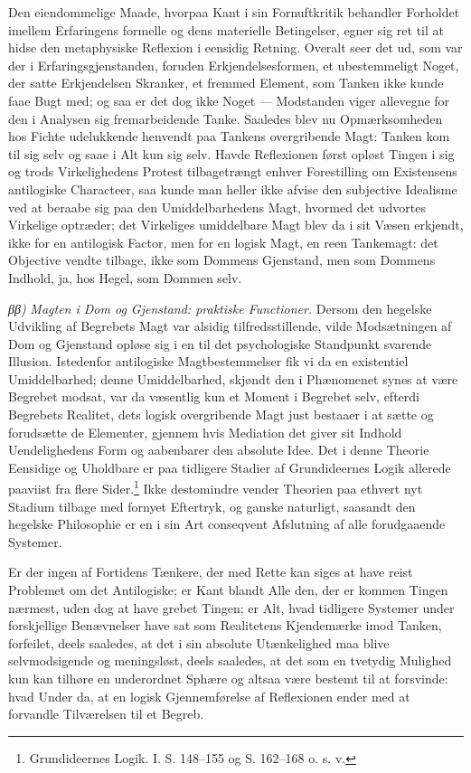 \documentclass[12pt]{book}
\newcommand{\opage}[1]{\marginnote{\footnotesize\textit{[#1]}}}
\begin{document}
Den eiendommelige Maade, hvorpaa Kant i sin Fornuftkritik
behandler Forholdet imellem Erfaringens formelle og
dens materielle Betingelser, egner sig ret til at hidse den metaphysiske
Reflexion i eensidig Retning. Overalt seer det
ud, som var der i Erfaringsgjenstanden, foruden Erkjendelsesformen,
et ubestemmeligt Noget, der satte Erkjendelsen Skranker,
et fremmed Element, som Tanken ikke kunde faae Bugt med;
og saa er det dog ikke Noget --- Modstanden viger allevegne for
den i Analysen sig fremarbeidende Tanke. Saaledes blev nu
Opmærksomheden hos Fichte udelukkende henvendt paa Tankens
overgribende Magt: Tanken kom til sig selv og saae i Alt
kun sig selv. Havde Reflexionen først opløst Tingen i sig og
trods Virkelighedens Protest tilbagetrængt enhver Forestilling
om Existensens antilogiske Characteer, saa kunde man heller
ikke afvise den subjective Idealisme ved at beraabe sig paa den
Umiddelbarhedens Magt, hvormed det udvortes Virkelige optræder;
det Virkeliges umiddelbare Magt blev da i sit Væsen
erkjendt, ikke for en antilogisk Factor, men for en logisk Magt,
en reen Tankemagt: det Objective vendte tilbage, ikke som
Dommens Gjenstand, men som Dommens Indhold, ja, hos
Hegel, som Dommen selv.

\textit{ββ)} \emph{Magten i Dom og Gjenstand: praktiske
Functioner.} Dersom den hegelske Udvikling af Begrebets
Magt var alsidig tilfredsstillende, vilde Modsætningen af Dom
og Gjenstand opløse sig i en til det psychologiske Standpunkt
svarende Illusion. Istedenfor antilogiske Magtbestemmelser fik
vi da en existentiel Umiddelbarhed; denne Umiddelbarhed,
skjøndt den i Phænomenet synes at være Begrebet modsat,
var da væsentlig kun et Moment i Begrebet selv, efterdi Begrebets
Realitet, dets logisk overgribende Magt just bestaaer i
at sætte og forudsætte de Elementer, gjennem hvis Mediation
det giver sit Indhold Uendelighedens Form og aabenbarer den
\opage{118}absolute Idee. Det i denne Theorie Eensidige og Uholdbare
er paa tidligere Stadier af Grundideernes Logik allerede paaviist
fra flere Sider.\footnote{Grundideernes Logik. I. S. 148--155 og S. 162--168 o. s. v.} %
Ikke destomindre vender Theorien
paa ethvert nyt Stadium tilbage med fornyet Eftertryk, og
ganske naturligt, saasandt den hegelske Philosophie er en i sin
Art conseqvent Afslutning af alle forudgaaende Systemer.

Er der ingen af Fortidens Tænkere, der med Rette kan
siges at have reist Problemet om det Antilogiske; er Kant
blandt Alle den, der er kommen Tingen nærmest, uden dog at
have grebet Tingen; er Alt, hvad tidligere Systemer under
forskjellige Benævnelser have sat som Realitetens Kjendemærke
imod Tanken, forfeilet, deels saaledes, at det i sin absolute
Utænkelighed maa blive selvmodsigende og meningsløst, deels
saaledes, at det som en tvetydig Mulighed kun kan tilhøre en
underordnet Sphære og altsaa være bestemt til at forsvinde:
hvad Under da, at en logisk Gjennemførelse af Reflexionen
ender med at forvandle Tilværelsen til et Begreb.
\end{document}
